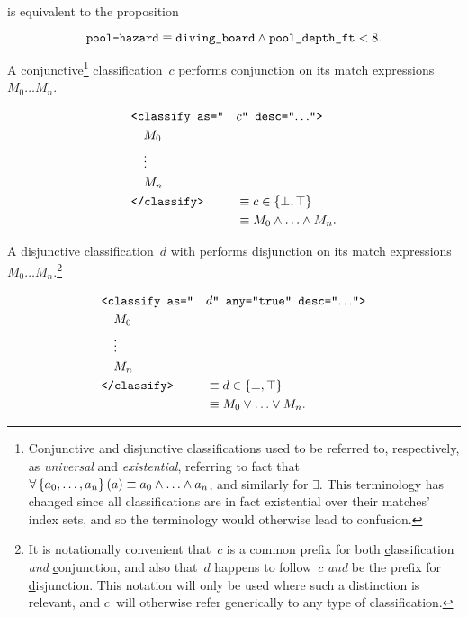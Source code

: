 \noindent
is equivalent to the proposition

\begin{equation*}
  \texttt{pool-hazard} \equiv \texttt{diving\_board}
    \wedge \texttt{pool\_depth\_ft} < 8.
\end{equation*}

\goodbreak
{}
\begin{definition}
  A conjunctive\footnote{%
    Conjunctive and disjunctive classifications used to be referred to,
      respectively,
      as \emph{universal} and \emph{existential},
        referring to fact that
          $\forall\left\{a_0,\ldots,a_n\right\}(a) \equiv a_0\wedge\ldots\wedge a_n$,
            and similarly for $\exists$.
    This terminology has changed since all classifications are in fact
      existential over their matches' index sets,
        and so the terminology would otherwise lead to confusion.
    }
    classification~$c$ performs conjunction on its match expressions
      $M_0\ldots M_n$.

  \begin{alignat*}{2}
    &\texttt{<classify as="}&&c\texttt{" desc="$\ldots$">} \\
    &\quad M_0 \\
    &\quad \vdots \\
    &\quad M_n \\
    &\texttt{</classify>}
      &&\equiv c\in\{\bot,\top\} \\
    & &&\equiv M_0 \wedge \ldots \wedge M_n.
  \end{alignat*}
\end{definition}

\begin{definition}
  A disjunctive classification~$d$ with 
    performs disjunction on its match expressions
    $M_0\ldots M_n$.\footnote{%
      It is notationally convenient that~$c$ is a common prefix for both
        \underline{c}lassification \emph{and} \underline{c}onjunction,
          and also that~$d$ happens to follow~$c$ \emph{and} be the prefix for
          \underline{d}isjunction.
      This notation will only be used where such a distinction is relevant,
        and $c$~will otherwise refer generically to any type of
        classification.}

  \begin{alignat*}{2}
    &\texttt{<classify as="} &&d\texttt{" any="true" desc="$\ldots$">} \\
    &\quad M_0 \\
    &\quad \vdots \\
    &\quad M_n \\
    &\texttt{</classify>}
      &&\equiv d\in\{\bot,\top\} \\
    & &&\equiv M_0 \vee \ldots \vee M_n.
  \end{alignat*}
\end{definition}


